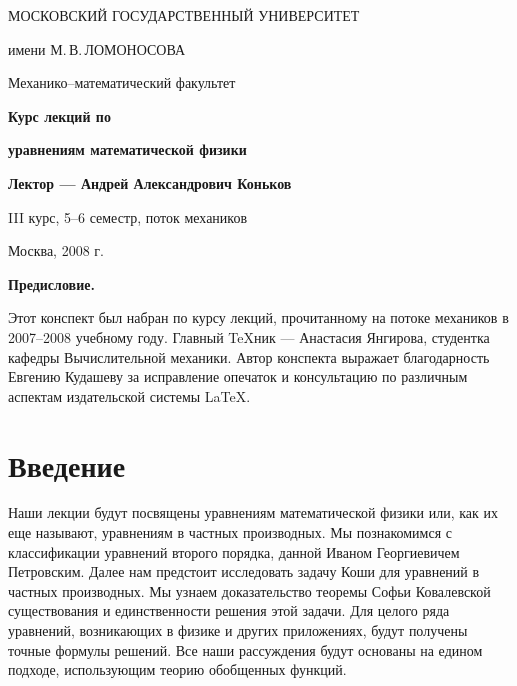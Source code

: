 \documentclass[12pt,a4paper,draft]{article}
\DeclareRobustCommand*{\т}{~--- }
\DeclareRobustCommand*{\ч}{~-- }
\begin{document}

\begin{titlepage}
\vskip40pt \centerline{\Large МОСКОВСКИЙ ГОСУДАРСТВЕННЫЙ
УНИВЕРСИТЕТ}
\medskip
\centerline{\Large имени М.\,В.\,ЛОМОНОСОВА}
\medskip
\centerline{\Large Механико--математический факультет}

\par\vskip40pt

\begin{figure}[htbp]
    \centering
    \centerline{}
\end{figure}

\par\vskip40pt

\centerline{\Huge\textbf{\textsf{Курс лекций по}}}
\medskip

\centerline{\Huge\textbf{\textsf{уравнениям математической
физики}}}
\medskip
\par\vskip30pt

\centerline{\Large\textbf{\textsf{Лектор --- Андрей Александрович
Коньков}}}
\medskip

\par\vskip70pt

\centerline{III курс, 5--6 семестр, поток механиков}

\par\vskip240pt

\centerline{Москва, 2008 г.}

\end{titlepage}

\newpage

\tableofcontents

\newpage

\begin{center}
\textbf{Предисловие.}\end{center} Этот конспект был набран по
курсу лекций, прочитанному на потоке механиков в 2007--2008
учебному году. Главный \TeX ник --- Анастасия Янгирова, студентка
кафедры Вычислительной механики. Автор конспекта выражает
благодарность Евгению Кудашеву за исправление опечаток и
консультацию по различным аспектам издательской системы \LaTeX.


\section*{Введение}

Наши лекции будут посвящены уравнениям математической физики или, как их еще называют,
уравнениям в частных производных.
Мы познакомимся с классификации уравнений второго порядка,
данной Иваном Георгиевичем Петровским.
Далее нам предстоит исследовать задачу Коши для уравнений в частных производных.
Мы узнаем доказательство теоремы Софьи Ковалевской существования и единственности
решения этой задачи.
Для целого ряда уравнений, возникающих в физике и других приложениях,
будут получены точные формулы решений.
Все наши рассуждения будут основаны на едином подходе, использующим теорию обобщенных функций.
\end{document}
